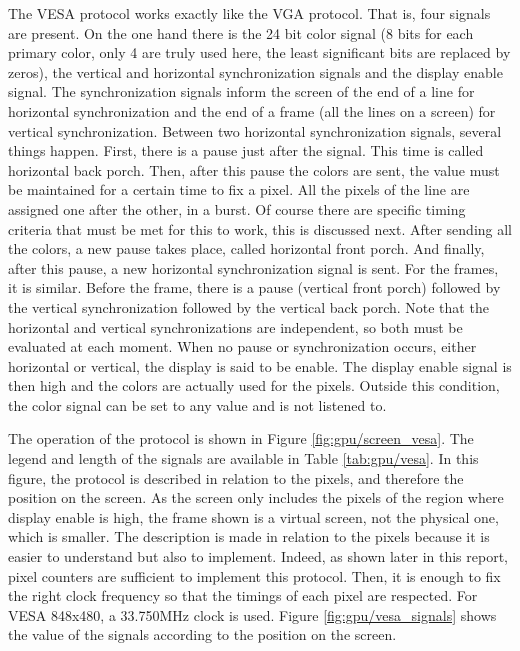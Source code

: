 The VESA protocol \cite{vesa} works exactly like the VGA protocol. That is, four signals are present. On the 
one hand there is the 24 bit color signal (8 bits for each primary color, only 4 are truly used
here, the least significant bits are replaced by zeros), the vertical and 
horizontal synchronization signals and the display enable signal. The synchronization signals 
inform the screen of the end of a line for horizontal synchronization and the end of a frame (all 
the lines on a screen) for vertical synchronization. Between two horizontal synchronization 
signals, several things happen. First, there is a pause just after the signal. This time is called 
horizontal back porch. Then, after this pause the colors are sent, the value must be maintained for 
a certain time to fix a pixel. All the pixels of the line are assigned one after the other, in a 
burst. Of course there are specific timing criteria that must be met for this to work, this is 
discussed next. After sending all the colors, a new pause takes place, called horizontal front 
porch. And finally, after this pause, a new horizontal synchronization signal is sent. For the 
frames, it is similar. Before the frame, there is a pause (vertical front porch) followed by the 
vertical synchronization followed by the vertical back porch. Note that the horizontal and vertical 
synchronizations are independent, so both must be evaluated at each moment. When no pause or 
synchronization occurs, either horizontal or vertical, the display is said to be enable. The 
display enable signal is then high and the colors are actually used for the pixels. Outside this 
condition, the color signal can be set to any value and is not listened to. 

The operation of the protocol is shown in Figure \ref{fig:gpu/screen_vesa}. The legend and length
of the signals are available in Table \ref{tab:gpu/vesa}. In this figure, 
the protocol is described in relation to the pixels, and therefore the position on the screen. As 
the screen only includes the pixels of the region where display enable is high, the frame shown is 
a virtual screen, not the physical one, which is smaller. The description is made in relation to the 
pixels because 
it is easier to understand but also to implement. Indeed, as shown later in this report, pixel 
counters are sufficient to implement this protocol. Then, it is enough to fix the right clock 
frequency so that the timings of each pixel are respected. For VESA 848x480, a  33.750MHz clock
is used. Figure \ref{fig:gpu/vesa_signals} shows the value of the signals according to the position
on the screen.

